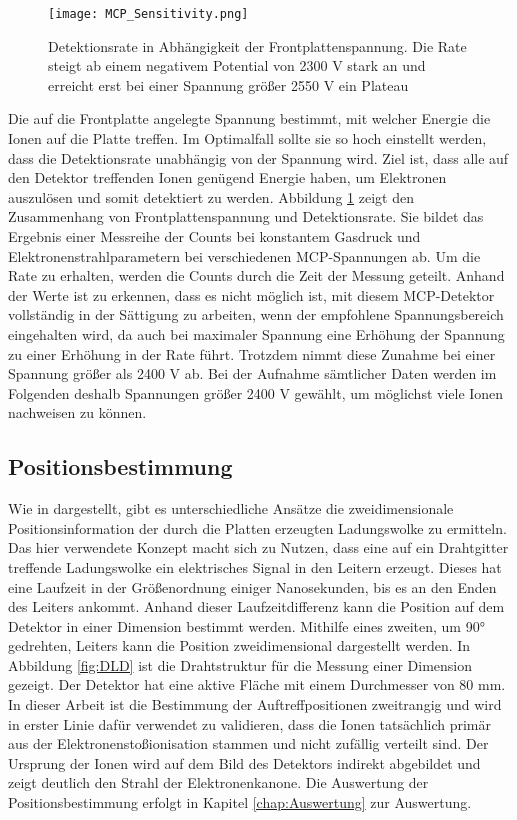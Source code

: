 \begin{figure}
    \centering
    \texttt{[image: MCP\_Sensitivity.png]}
    \caption[Detektionsrate in Abhängigkeit der Frontplattenspannung]{Detektionsrate in Abhängigkeit der Frontplattenspannung. Die Rate steigt ab einem negativem Potential von 2300 V stark an und erreicht erst bei einer Spannung größer 2550 V ein Plateau}
    \label{fig:Frontplattenspannung}
\end{figure}

Die auf die Frontplatte angelegte Spannung bestimmt, mit welcher Energie die Ionen auf die Platte treffen. Im Optimalfall sollte sie so hoch einstellt werden, dass die Detektionsrate unabhängig von der Spannung wird. Ziel ist, dass alle auf den Detektor treffenden Ionen genügend Energie haben, um Elektronen auszulösen und somit detektiert zu werden. Abbildung \ref{fig:Frontplattenspannung} zeigt den Zusammenhang von Frontplattenspannung und Detektionsrate. Sie bildet das Ergebnis einer Messreihe der Counts bei konstantem Gasdruck und Elektronenstrahlparametern bei verschiedenen MCP-Spannungen ab. Um die Rate zu erhalten, werden die Counts durch die Zeit der Messung geteilt. Anhand der Werte ist zu erkennen, dass es nicht möglich ist, mit diesem MCP-Detektor vollständig in der Sättigung zu arbeiten, wenn der empfohlene Spannungsbereich eingehalten wird, da auch bei maximaler Spannung eine Erhöhung der Spannung zu einer Erhöhung in der Rate führt. Trotzdem nimmt diese Zunahme bei einer Spannung größer als 2400 V ab. Bei der Aufnahme sämtlicher Daten werden im Folgenden deshalb Spannungen größer 2400 V gewählt, um möglichst viele Ionen nachweisen zu können.

\subsection{Positionsbestimmung}
Wie in \cite{Detektorsystem} dargestellt, gibt es unterschiedliche Ansätze die zweidimensionale Positionsinformation der durch die Platten erzeugten Ladungswolke zu ermitteln. Das hier verwendete Konzept macht sich zu Nutzen, dass eine auf ein Drahtgitter treffende Ladungswolke ein elektrisches Signal in den Leitern erzeugt. Dieses hat eine Laufzeit in der Größenordnung einiger Nanosekunden, bis es an den Enden des Leiters ankommt. Anhand dieser Laufzeitdifferenz kann die Position auf dem Detektor in einer Dimension bestimmt werden. Mithilfe eines zweiten, um \ang{90} gedrehten, Leiters kann die Position zweidimensional dargestellt werden. In Abbildung \ref{fig:DLD} ist die Drahtstruktur für die Messung einer Dimension gezeigt. Der Detektor hat eine aktive Fläche mit einem Durchmesser von 80 mm. In dieser Arbeit ist die Bestimmung der Auftreffpositionen zweitrangig und wird in erster Linie dafür verwendet zu validieren, dass die Ionen tatsächlich primär aus der Elektronenstoßionisation stammen und nicht zufällig verteilt sind. Der Ursprung der Ionen wird auf dem Bild des Detektors indirekt abgebildet und zeigt deutlich den Strahl der Elektronenkanone. Die Auswertung der Positionsbestimmung erfolgt in Kapitel \ref{chap:Auswertung} zur Auswertung.


